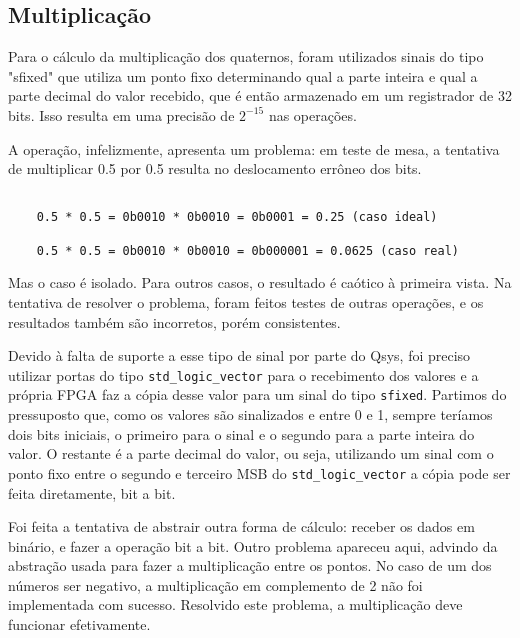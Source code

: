 \documentclass [12pt,oneside] {article}
\begin{document}
\subsection{Multiplicação}

	Para o cálculo da multiplicação dos quaternos, foram
utilizados sinais do tipo "sfixed" que utiliza um ponto fixo
determinando qual a parte inteira e qual a parte decimal do valor
recebido, que é então armazenado em um registrador de 32 bits. Isso
resulta em uma precisão de $2^{-15}$ nas operações.

	A operação, infelizmente, apresenta um problema: em teste de
mesa, a tentativa de multiplicar 0.5 por 0.5 resulta no deslocamento
errôneo dos bits.

\begin{footnotesize} \begin{verbatim}

	0.5 * 0.5 = 0b0010 * 0b0010 = 0b0001 = 0.25 (caso ideal)

	0.5 * 0.5 = 0b0010 * 0b0010 = 0b000001 = 0.0625 (caso real)

\end{verbatim} \end{footnotesize}

Mas o caso é isolado. Para outros casos, o resultado é caótico à
primeira vista. Na tentativa de resolver o problema, foram feitos
testes de outras operações, e os resultados também são incorretos,
porém consistentes.

	Devido à falta de suporte a esse tipo de sinal por parte do
Qsys, foi preciso utilizar portas do tipo \texttt{std\_logic\_vector}
para o recebimento dos valores e a própria FPGA faz a cópia desse
valor para um sinal do tipo \texttt{sfixed}. Partimos do pressuposto que,
como os valores são sinalizados e entre 0 e 1, sempre teríamos dois
bits iniciais, o primeiro para o sinal e o segundo para a parte
inteira do valor. O restante é a parte decimal do valor, ou seja,
utilizando um sinal com o ponto fixo entre o segundo e terceiro MSB do
\texttt{std\_logic\_vector} a cópia pode ser feita diretamente, bit a
bit.

	Foi feita a tentativa de abstrair outra forma de cálculo:
receber os dados em binário, e fazer a operação bit a bit. Outro
problema apareceu aqui, advindo da abstração usada para fazer a multiplicação entre os pontos. No caso de
um dos números ser negativo, a multiplicação em complemento de 2
não foi implementada com sucesso. Resolvido este problema, a
multiplicação deve funcionar efetivamente.
\end{document}
